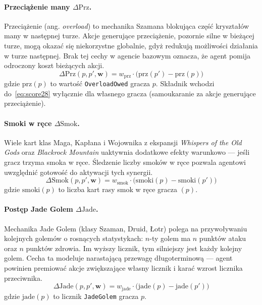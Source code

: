 \paragraph{Przeciążenie many $\Delta \text{Prz}$.}

Przeciążenie (ang. \textit{overload}) to mechanika Szamana blokująca część kryształów many w następnej turze. Akcje generujące przeciążenie, pozornie silne w bieżącej turze, mogą okazać się niekorzystne globalnie, gdyż redukują możliwości działania w turze następnej. Brak tej cechy w agencie bazowym oznacza, że agent pomija odroczony koszt bieżących akcji.
\begin{equation}
    \Delta \text{Prz}(p, p', \mathbf{w}) =
        w_{\text{prz}} \cdot \bigl(\text{prz}(p') - \text{prz}(p)\bigr)
\end{equation}
gdzie $\text{prz}(p)$ to wartość \texttt{OverloadOwed} gracza $p$. Składnik wchodzi do~\eqref{eq:score28} wyłącznie dla własnego gracza (samoukaranie za akcje generujące przeciążenie).

\paragraph{Smoki w ręce $\Delta \text{Smok}$.}

Wiele kart klas Maga, Kapłana i Wojownika z ekspansji \textit{Whispers of the Old Gods} oraz \textit{Blackrock Mountain} uaktywnia dodatkowe efekty warunkowo --- jeśli gracz trzyma smoka w ręce. Śledzenie liczby smoków w ręce pozwala agentowi uwzględnić gotowość do aktywacji tych synergii.
\begin{equation}
    \Delta \text{Smok}(p, p', \mathbf{w}) =
        w_{\text{smok}} \cdot
        \bigl(\text{smoki}(p) - \text{smoki}(p')\bigr)
\end{equation}
gdzie $\text{smoki}(p)$ to liczba kart rasy smok w ręce gracza $(p)$.

\paragraph{Postęp Jade Golem $\Delta \text{Jade}$.}

Mechanika Jade Golem (klasy Szaman, Druid, Łotr) polega na przywoływaniu kolejnych golemów o rosnących statystykach: $n$-ty golem ma $n$ punktów ataku oraz $n$ punktów zdrowia. Im wyższy licznik, tym silniejszy jest każdy kolejny golem. Cecha ta modeluje narastającą przewagę długoterminową --- agent powinien premiować akcje zwiększające własny licznik i karać wzrost licznika przeciwnika.
\begin{equation}
    \Delta \text{Jade}(p, p', \mathbf{w}) =
        w_{\text{jade}} \cdot
        \bigl(\text{jade}(p) - \text{jade}(p')\bigr)
\end{equation}
gdzie $\text{jade}(p)$ to licznik \texttt{JadeGolem} gracza $p$.

